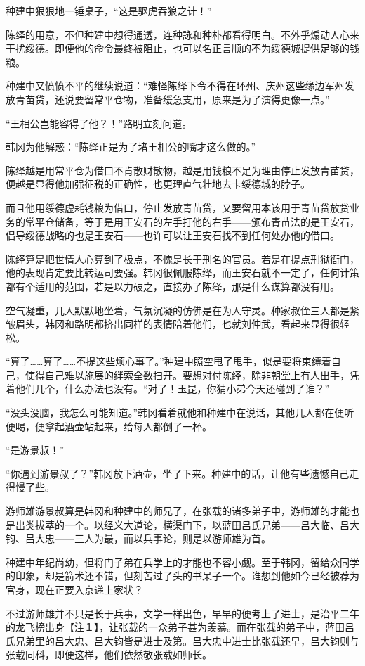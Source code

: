 种建中狠狠地一锤桌子，“这是驱虎吞狼之计！”

陈绎的用意，不但种建中想得通透，连种詠和种朴都看得明白。不外乎煽动人心来干扰绥德。即便他的命令最终被阻止，也可以名正言顺的不为绥德城提供足够的钱粮。

种建中又愤愤不平的继续说道：“难怪陈绎下令不得在环州、庆州这些缘边军州发放青苗贷，还说要留常平仓物，准备缓急支用，原来是为了演得更像一点。”

“王相公岂能容得了他？！”路明立刻问道。

韩冈为他解惑：“陈绎正是为了堵王相公的嘴才这么做的。”

陈绎越是用常平仓为借口不肯散财散物，越是用钱粮不足为理由停止发放青苗贷，便越是显得他加强征税的正确性，也更理直气壮地去卡绥德城的脖子。

而且他用绥德虚耗钱粮为借口，停止发放青苗贷，又要留用本该用于青苗贷放贷业务的常平仓储备，等于是用王安石的左手打他的右手——颁布青苗法的是王安石，倡导绥德战略的也是王安石——也许可以让王安石找不到任何处办他的借口。

陈绎算是把世情人心算到了极点，不愧是长于刑名的官员。若是在提点刑狱衙门，他的表现肯定要比转运司要强。韩冈很佩服陈绎，而王安石就不一定了，任何计策都有个适用的范围，若是以力破之，直接办了陈绎，那是什么谋算都没有用。

空气凝重，几人默默地坐着，气氛沉凝的仿佛是在为人守灵。种家叔侄三人都是紧皱眉头，韩冈和路明都挤出同样的表情陪着他们，也就刘仲武，看起来显得很轻松。

“算了……算了……不提这些烦心事了。”种建中照空甩了甩手，似是要将束缚着自己，使得自己难以施展的绊索全数扫开。要想对付陈绎，除非朝堂上有人出手，凭着他们几个，什么办法也没有。“对了！玉昆，你猜小弟今天还碰到了谁？”

“没头没脑，我怎么可能知道。”韩冈看着就他和种建中在说话，其他几人都在便听便喝，便拿起酒壶站起来，给每人都倒了一杯。

“是游景叔！”

“你遇到游景叔了？”韩冈放下酒壶，坐了下来。种建中的话，让他有些遗憾自己走得慢了些。

游师雄游景叔算是韩冈和种建中的师兄了，在张载的诸多弟子中，游师雄的才能也是出类拔萃的一个。以经义大道论，横渠门下，以蓝田吕氏兄弟——吕大临、吕大钧、吕大忠——三人为最，而以兵事论，则是以游师雄为首。

种建中年纪尚幼，但将门子弟在兵学上的才能也不容小觑。至于韩冈，留给众同学的印象，却是箭术还不错，但刻苦过了头的书呆子一个。谁想到他如今已经被荐为官身，现在正要入京递上家状？

不过游师雄并不只是长于兵事，文学一样出色，早早的便考上了进士，是治平二年的龙飞榜出身【注１】，让张载的一众弟子甚为羡慕。而在张载的弟子中，蓝田吕氏兄弟里的吕大忠、吕大钧皆是进士及第。吕大忠中进士比张载还早，吕大钧则与张载同科，即便这样，他们依然敬张载如师长。

